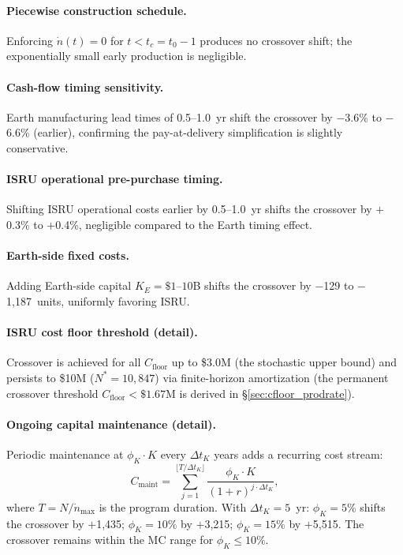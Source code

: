 \documentclass[preprint,12pt]{elsarticle}
\begin{document}
\paragraph{Piecewise construction schedule.} Enforcing $\dot{n}(t) = 0$ for $t < t_c = t_0 - 1$ produces no crossover shift; the exponentially small early production is negligible.

\paragraph{Cash-flow timing sensitivity.} Earth manufacturing lead times of 0.5--1.0~yr shift the crossover by $-$3.6\% to $-$6.6\% (earlier), confirming the pay-at-delivery simplification is slightly conservative.

\paragraph{ISRU operational pre-purchase timing.} Shifting ISRU operational costs earlier by 0.5--1.0~yr shifts the crossover by $+$0.3\% to $+$0.4\%, negligible compared to the Earth timing effect.

\paragraph{Earth-side fixed costs.} Adding Earth-side capital $K_E = \$1$--$10$B shifts the crossover by $-$129 to $-$1{,}187~units, uniformly favoring ISRU.

\paragraph{ISRU cost floor threshold (detail).} Crossover is achieved for all $C_{\mathrm{floor}}$ up to \$3.0M (the stochastic upper bound) and persists to \$10M ($N^* = 10{,}847$) via finite-horizon amortization (the permanent crossover threshold $C_{\mathrm{floor}} < \$1.67$M is derived in \S\ref{sec:cfloor_prodrate}).

\paragraph{Ongoing capital maintenance (detail).} Periodic maintenance at $\phi_K \cdot K$ every $\Delta t_K$ years adds a recurring cost stream:
\begin{equation}
  C_{\mathrm{maint}} = \sum_{j=1}^{\lfloor T/\Delta t_K \rfloor} \frac{\phi_K \cdot K}{(1+r)^{j \cdot \Delta t_K}},
\end{equation}
where $T = N/\dot{n}_{\max}$ is the program duration. With $\Delta t_K = 5$~yr: $\phi_K = 5\%$ shifts the crossover by $+$1{,}435; $\phi_K = 10\%$ by $+$3{,}215; $\phi_K = 15\%$ by $+$5{,}515. The crossover remains within the MC range for $\phi_K \leq 10\%$.
\end{document}
